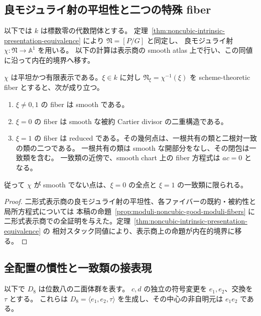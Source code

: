 \subsection{良モジュライ射の平坦性と二つの特殊 fiber}

以下では $k$ は標数零の代数閉体とする。
定理~\ref{thm:noncubic-intrinsic-presentation-equivalence} により $\mathfrak N=[P/G]$ と同定し、
良モジュライ射 $\chi:\mathfrak N\to\mathbb A^1$ を用いる。
以下の計算は表示商の smooth atlas 上で行い、この同値に沿って内在的境界へ移す。

\begin{proposition}
\label{prop:noncubic-good-moduli-fibers}
$\chi$ は平坦かつ有限表示である。$\xi\in k$ に対し
$\mathfrak N_\xi=\chi^{-1}(\xi)$ を scheme-theoretic fiber とすると、次が成り立つ。
\begin{enumerate}
\item $\xi\ne0,1$ の fiber は smooth である。
\item $\xi=0$ の fiber は smooth な被約 Cartier divisor の二重構造である。
\item $\xi=1$ の fiber は reduced である。その幾何点は、一根共有の類と二根対一致の類の二つである。
一根共有の類は smooth な開部分をなし、その閉包は一致類を含む。
一致類の近傍で、smooth chart 上の fiber 方程式は $ac=0$ となる。
\end{enumerate}
従って $\chi$ が smooth でない点は、$\xi=0$ の全点と $\xi=1$ の一致類に限られる。
\end{proposition}
\begin{proof}
二形式表示商の良モジュライ射の平坦性、各ファイバーの既約・被約性と局所方程式については
本稿の命題~\ref{prop:moduli-noncubic-good-moduli-fibers} に
二形式表示商での全証明を与えた。定理~\ref{thm:noncubic-intrinsic-presentation-equivalence} の
相対スタック同値により、表示商上の命題が内在的境界に移る。
\end{proof}


\subsection{全配置の慣性と一致類の接表現}

以下で $D_8$ は位数八の二面体群を表す。
$c,d$ の独立の符号変更を $e_1,e_2$、交換を $\tau$ とする。
これらは $D_8=\langle e_1,e_2,\tau\rangle$ を生成し、その中心の非自明元は $e_1e_2$ である。

